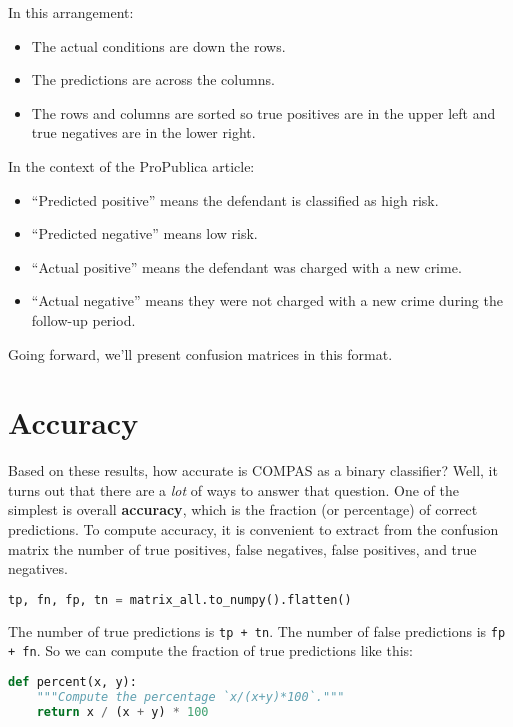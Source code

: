 In this arrangement:

\begin{itemize}
\item
  The actual conditions are down the rows.
\item
  The predictions are across the columns.
\item
  The rows and columns are sorted so true positives are in the upper
  left and true negatives are in the lower right.
\end{itemize}

In the context of the ProPublica article:

\begin{itemize}
\item
  ``Predicted positive'' means the defendant is classified as high risk.
\item
  ``Predicted negative'' means low risk.
\item
  ``Actual positive'' means the defendant was charged with a new crime.
\item
  ``Actual negative'' means they were not charged with a new crime
  during the follow-up period.
\end{itemize}

Going forward, we'll present confusion matrices in this format.

\section{Accuracy}\label{accuracy}

Based on these results, how accurate is COMPAS as a binary classifier?
Well, it turns out that there are a \emph{lot} of ways to answer that
question. One of the simplest is overall \textbf{accuracy}, which is the
fraction (or percentage) of correct predictions. To compute accuracy, it
is convenient to extract from the confusion matrix the number of true
positives, false negatives, false positives, and true negatives.

\begin{lstlisting}[language=Python,style=source]
tp, fn, fp, tn = matrix_all.to_numpy().flatten()
\end{lstlisting}

The number of true predictions is \passthrough{\lstinline!tp + tn!}. The
number of false predictions is \passthrough{\lstinline!fp + fn!}. So we
can compute the fraction of true predictions like this:

\begin{lstlisting}[language=Python,style=source]
def percent(x, y):
    """Compute the percentage `x/(x+y)*100`."""
    return x / (x + y) * 100
\end{lstlisting}

